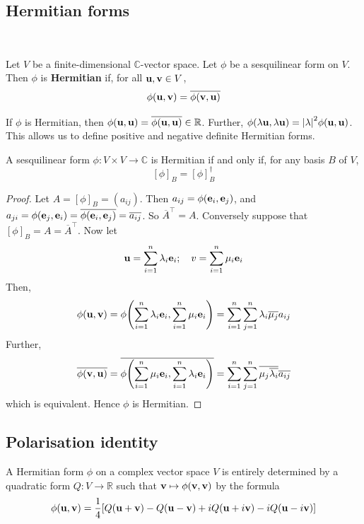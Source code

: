 \documentclass[a4paper]{article}
\begin{document}
\subsection{Hermitian forms}
\ \vspace*{-1.5em}
\begin{definition}
	Let \( V \) be a finite-dimensional \( \mathbb C \)-vector space.
	Let \( \phi \) be a sesquilinear form on \( V \).
	Then \( \phi \) is \textbf{Hermitian} if, for all \( {\bf u}, {\bf v} \in V \),
	\[
		\phi({\bf u}, {\bf v}) = \overline{\phi({\bf v},{\bf u})}
	\]
\end{definition}
\begin{remark}
	If \( \phi \) is Hermitian, then \( \phi({\bf u},{\bf u}) = \overline{\phi({\bf u},{\bf u})} \in \mathbb R \).
	Further, \( \phi(\lambda {\bf u}, \lambda {\bf u}) = \abs{\lambda}^2 \phi({\bf u},{\bf u}) \).
	This allows us to define positive and negative definite Hermitian forms.
\end{remark}
\begin{lemma}
	A sesquilinear form \( \phi \colon V \times V \to \mathbb C \) is Hermitian if and only if, for any basis \( B \) of \( V \),
	\[
		[\phi]_B = [\phi]_B^\dagger
	\]
\end{lemma}
\begin{proof}
	Let \( A = [\phi]_B = (a_{ij}) \).
	Then \( a_{ij} = \phi({\bf e}_i, {\bf e}_j) \), and \( a_{ji} = \phi({\bf e}_j, {\bf e}_i) = \overline{\phi({\bf e}_i, {\bf e}_j)} = \overline{a_{ij}} \).
	So \( \overline A^\top = A \).
	Conversely suppose that \( [\phi]_B = A = \overline A^\top \).
	Now let
	\[
		{\bf u} = \sum_{i=1}^n \lambda_i {\bf e}_i;\quad v = \sum_{i=1}^n \mu_i {\bf e}_i
	\]
	Then,
	\[
		\phi({\bf u},{\bf v}) = \phi\qty(\sum_{i=1}^n \lambda_i {\bf e}_i, \sum_{i=1}^n \mu_i {\bf e}_i) = \sum_{i=1}^n \sum_{j=1}^n \lambda_i \overline{\mu_j} a_{ij}
	\]
	Further,
	\[
		\overline{\phi({\bf v},{\bf u})} = \overline{\phi\qty(\sum_{i=1}^n \mu_i {\bf e}_i, \sum_{i=1}^n \lambda_i {\bf e}_i)} = \sum_{i=1}^n \sum_{j=1}^n \overline{\mu_j \overline{\lambda_i}} \overline{a_{ij}}
	\]
	which is equivalent.
	Hence \( \phi \) is Hermitian.
\end{proof}

\subsection{Polarisation identity}
A Hermitian form \( \phi \) on a complex vector space \( V \) is entirely determined by a quadratic form \( Q \colon V \to \mathbb R \) such that \( {\bf v} \mapsto \phi({\bf v},{\bf v}) \) by the formula
\[
	\phi({\bf u},{\bf v}) = \frac{1}{4} \qty[ Q({\bf u}+{\bf v}) - Q({\bf u}-{\bf v}) + iQ({\bf u}+i{\bf v}) - iQ({\bf u}-i{\bf v}) ]
\]
\end{document}
